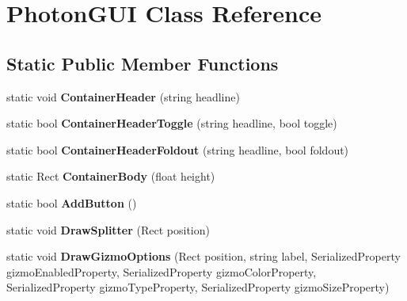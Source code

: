 \hypertarget{class_photon_g_u_i}{}\section{Photon\+G\+UI Class Reference}
\label{class_photon_g_u_i}
\subsection*{Static Public Member Functions}
\begin{DoxyCompactItemize}
\item 
static void {\bfseries Container\+Header} (string headline)\hypertarget{class_photon_g_u_i_aadea221ddac8eb43d724175da7f4553c}{}\label{class_photon_g_u_i_aadea221ddac8eb43d724175da7f4553c}

\item 
static bool {\bfseries Container\+Header\+Toggle} (string headline, bool toggle)\hypertarget{class_photon_g_u_i_aa69826ffe56e2ea427b664619203a672}{}\label{class_photon_g_u_i_aa69826ffe56e2ea427b664619203a672}

\item 
static bool {\bfseries Container\+Header\+Foldout} (string headline, bool foldout)\hypertarget{class_photon_g_u_i_a3b63ed2db12ad8fb010e3ae351b3a113}{}\label{class_photon_g_u_i_a3b63ed2db12ad8fb010e3ae351b3a113}

\item 
static Rect {\bfseries Container\+Body} (float height)\hypertarget{class_photon_g_u_i_a000cf29f3883925576cc7dd90a3ce777}{}\label{class_photon_g_u_i_a000cf29f3883925576cc7dd90a3ce777}

\item 
static bool {\bfseries Add\+Button} ()\hypertarget{class_photon_g_u_i_a40f7c12e66ef8cf52f4c74e0d5ec9544}{}\label{class_photon_g_u_i_a40f7c12e66ef8cf52f4c74e0d5ec9544}

\item 
static void {\bfseries Draw\+Splitter} (Rect position)\hypertarget{class_photon_g_u_i_aac5f1084d59d892082792940ccb6bb51}{}\label{class_photon_g_u_i_aac5f1084d59d892082792940ccb6bb51}

\item 
static void {\bfseries Draw\+Gizmo\+Options} (Rect position, string label, Serialized\+Property gizmo\+Enabled\+Property, Serialized\+Property gizmo\+Color\+Property, Serialized\+Property gizmo\+Type\+Property, Serialized\+Property gizmo\+Size\+Property)\hypertarget{class_photon_g_u_i_a12f480b69a7e841cd7df18cfd7502b9c}{}\label{class_photon_g_u_i_a12f480b69a7e841cd7df18cfd7502b9c}

\end{DoxyCompactItemize}
